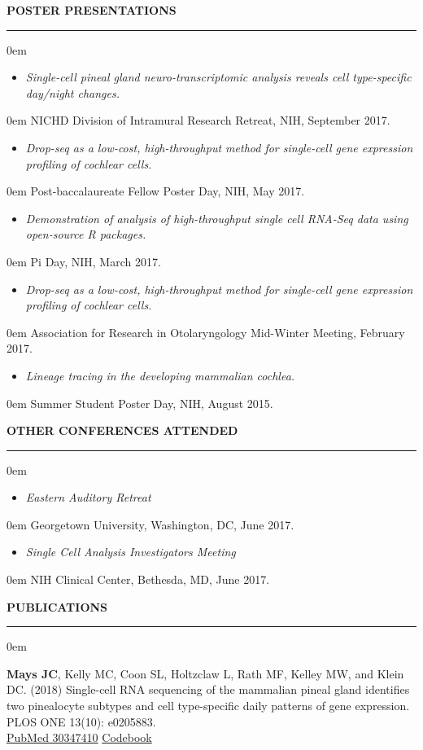 \documentclass[11pt, letterpaper]{article}
\newenvironment{CVSection}{
\begin{addmargin}[2em]{0em}
\begin{samepage}}
{\end{samepage}
\end{addmargin}\bigskip}
\newcommand{\CVList}[2]{
\begin{samepage}
\begin{itemize}[leftmargin=*]
\item \textsl{#1}
\end{itemize}
\begin{addmargin}[2.5em]{0em}
#2
\end{addmargin}
\end{samepage}
}
\newcommand{\CVHeading}[1]{
\MakeUppercase{\bf #1}
\smallskip
\hrule
\medskip
}
\begin{document}
\pagebreak
\CVHeading{Poster Presentations}
\begin{CVSection}
\CVList{Single-cell pineal gland neuro-transcriptomic analysis reveals cell type-specific day/night changes.}{NICHD Division of Intramural Research Retreat, NIH, September 2017.}
\CVList{Drop-seq as a low-cost, high-throughput method for single-cell gene expression profiling of cochlear cells.}{Post-baccalaureate Fellow Poster Day, NIH, May 2017.}
\CVList{Demonstration of analysis of high-throughput single cell RNA-Seq data using open-source R packages.}{Pi Day, NIH, March 2017.}
\CVList{Drop-seq as a low-cost, high-throughput method for single-cell gene expression profiling of cochlear cells.}{Association for Research in Otolaryngology Mid-Winter Meeting, February 2017.}
\CVList{Lineage tracing in the developing mammalian cochlea.}{Summer Student Poster Day, NIH, August 2015.}
\end{CVSection}

\CVHeading{Other Conferences Attended}
\begin{CVSection}
\CVList{Eastern Auditory Retreat}{Georgetown University, Washington, DC, June 2017.}
\CVList{Single Cell Analysis Investigators Meeting}{NIH Clinical Center, Bethesda, MD, June 2017.}
\end{CVSection}



\CVHeading{Publications}
\begin{CVSection}


\textbf{Mays JC}, Kelly MC, Coon SL, Holtzclaw L, Rath MF, Kelley MW, and Klein DC. (2018) Single-cell RNA sequencing of the mammalian pineal gland identifies two pinealocyte subtypes and cell type-specific daily patterns of gene expression. PLOS ONE 13(10): e0205883.\\
\hspace{2 in}\faFileTextO\hspace{1mm}\href{https://www.ncbi.nlm.nih.gov/pubmed/30347410}{PubMed 30347410}
\hspace{2mm}\faCode\hspace{1mm}\href{https://github.com/joeymays/PinealGland_SingleCell}{Codebook}



\end{CVSection}
\end{document}

